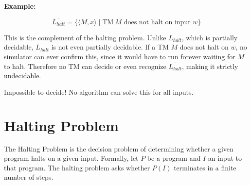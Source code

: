 \documentclass[12pt,a4paper,openany]{article}
\begin{document}
\begin{enumerate}
        \textbf{Example:} 

        \[
        \overline{L_{halt}} = \{\langle M, x\rangle \mid \text{TM} \ M \text{ does not halt on input } w\}
        \]

        This is the complement of the halting problem. Unlike \(L_{halt}\), which is partially decidable,
        \(\overline{L_{halt}}\) is not even partially decidable. If a TM \(M\) does not halt on \(w\),
        no simulator can ever confirm this, since it would have to run forever waiting for \(M\) to halt.
        Therefore no TM can decide or even recognize \(\overline{L_{halt}}\), making it strictly undecidable.

        \begin{center}
        \end{center}

        Impossible to decide! No algorithm can solve this for all inputs.

\end{enumerate}

\section{Halting Problem}

The Halting Problem is the decision problem of determining whether a given program halts on a given input. 
Formally, let $P$ be a program and $I$ an input to that program. The halting problem asks whether $P(I)$ terminates in a finite number of steps. 
\end{document}
